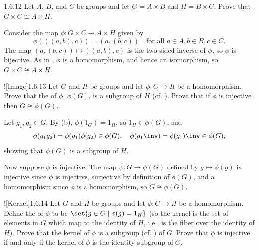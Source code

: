 \begin{exercise}{1.6.12}
    Let $A$, $B$, and $C$ be groups and let $G = A \times B$ and $H = B \times C$.
	Prove that $G \times C \cong A \times H$.
\end{exercise}

\begin{sol}
    Consider the map $\phi \colon G \times C \to A \times H$ given by
    \[
    	\phi(((a, b), c)) = (a, (b, c)) \quad \text{for all } a \in A, b \in B, c \in C.
    \]
    The map $(a, (b, c)) \mapsto ((a, b), c)$ is the two-sided inverse of $\phi$, so $\phi$ is bijective.
	As in , $\phi$ is a homomorphism, and hence an isomorphism, so $G \times C \cong A \times H$.
\end{sol}

\begin{exercise}![Image]{1.6.13}
    Let $G$ and $H$ be groups and let $\phi \colon G \to H$ be a homomorphism.
	Prove that the  of $\phi$, $\phi(G)$, is a subgroup of $H$ (cf. ).
	Prove that if $\phi$ is injective then $G \cong \phi(G)$.
\end{exercise}

\begin{sol}
    Let $g_1, g_2 \in G$.
    By (b), $\phi(1_G) = 1_H$, so $1_H \in \phi(G)$, and
    \[
        \phi(g_1g_2) = \phi(g_1)\phi(g_2) \in \phi(G), \quad \phi(g_1\inv) = \phi(g_1)\inv \in \phi(G),
    \]
    showing that $\phi(G)$ is a subgroup of $H$.

    Now suppose $\phi$ is injective.
    The map $\psi \colon G \to \phi(G)$ defined by $g \mapsto \phi(g)$ is injective since $\phi$ is injective, surjective by definition of $\phi(G)$, and a homomorphism since $\phi$ is a homomorphism, so $G \cong \phi(G)$.
\end{sol}

\begin{exercise}![Kernel]{1.6.14}
    Let $G$ and $H$ be groups and let $\phi \colon G \to H$ be a homomorphism.
	Define the  of $\phi$ to be $\set{g \in G \mid \phi(g) = 1_H }$ (so the kernel is the set of elements in $G$ which map to the identity of $H$, i.e., is the fiber over the identity of $H$).
	Prove that the kernel of $\phi$ is a subgroup (cf. ) of $G$.
	Prove that $\phi$ is injective if and only if the kernel of $\phi$ is the identity subgroup of $G$.
\end{exercise}

